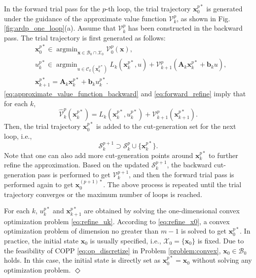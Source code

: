 \documentclass[journal]{IEEEtran}
\theoremstyle{definition}
\theoremstyle{definition}
\newtheorem*{remark}{Remark}
\let\oldremark\remark
\let\endoldremark\endremark
\renewenvironment{remark}
  {\oldremark}
  {\hfill$\Diamond$\endoldremark}
\renewcommand\vector[1]{\boldsymbol{#1}}
\newcommand\vb{{\vector{b}}}
\newcommand\vx{{\vector{x}}}
\newcommand\vA{{\vector{A}}}
\newcommand\bx{{\mathbf{x}}}
\DeclareMathOperator*{\argmin}{argmin}
\begin{document}
In the forward trial pass for the $p$-th loop, the trial trajectory $\bx_0^{p*}$ is generated under the guidance of the approximate value function $\mathcal{V}_k^p$, as shown in Fig. \ref{fig:ardp_one_loop}(a). Assume that $\mathcal{V}_k^p$ has been constructed in the backward pass. The trial trajectory is first generated as follows:
\begin{subequations}\label{eq:forward_refine}
    \begin{align}
        &\vx_0^{p*}\in \argmin_{\vx\in\mathcal{B}_0\cap \mathcal{X}_0} \mathcal{V}_0^p(\vx),\label{eq:refine_x0}\\
        &u_k^{p*} \in \argmin_{u\in\mathcal{C}_k(\vx_k^{p*})} L_k(\vx_k^{p*}, u) + \mathcal{V}_{k+1}^p(\vA_k\vx_k^{p*}+\vb_k u),\label{eq:refine_uk}\\
        &\vx_{k+1}^{p*} = \vA_k\vx_k^{p*}+\vb_k u_k^{p*}.
    \end{align}
\end{subequations}
\eqref{eq:approximate_value_function_backward} and \eqref{eq:forward_refine} imply that for each $k$,
\begin{equation}\label{eq:widehat_V_L_V_refine}
    \widehat{\mathcal{V}}_k^p(\vx_k^{p*}) = L_k(\vx_k^{p*}, u_k^{p*}) + \mathcal{V}_{k+1}^p(\vx_{k+1}^{p*}).
\end{equation}
Then, the trial trajectory $\bx_0^{p*}$ is added to the cut-generation set for the next loop, i.e.,
\begin{equation}\label{eq:ardp_more_sample}
    \mathcal{S}_k^{p+1}\supset\mathcal{S}_k^{p}\cup\{\vx_k^{p*}\}.
\end{equation}
Note that one can also add more cut-generation points around $\vx_k^{p*}$ to further refine the approximation. Based on the updated $\mathcal{S}_k^{p+1}$, the backward cut-generation pass is performed to get $\mathcal{V}_k^{p+1}$, and then the forward trial pass is performed again to get $\bx_0^{(p+1)*}$. The above process is repeated until the trial trajectory converges or the maximum number of loops is reached.

\begin{remark}
    For each $k$, $u_k^{p*}$ and $\vx_{k+1}^{p*}$ are obtained by solving the one-dimensional convex optimization problem \eqref{eq:refine_uk}. According to \eqref{eq:refine_x0}, a convex optimization problem of dimension no greater than $m-1$ is solved to get $\vx_0^{p*}$. In practice, the initial state $\vx_0$ is usually specified, i.e., $\mathcal{X}_0=\{\vx_0\}$ is fixed. Due to the feasibility of COPP \eqref{eq:op_discretize} in Problem \ref{problem:convex}, $\vx_0\in\mathcal{B}_0$ holds. In this case, the initial state is directly set as $\vx_0^{p*}=\vx_0$ without solving any optimization problem.
\end{remark}
\end{document}
